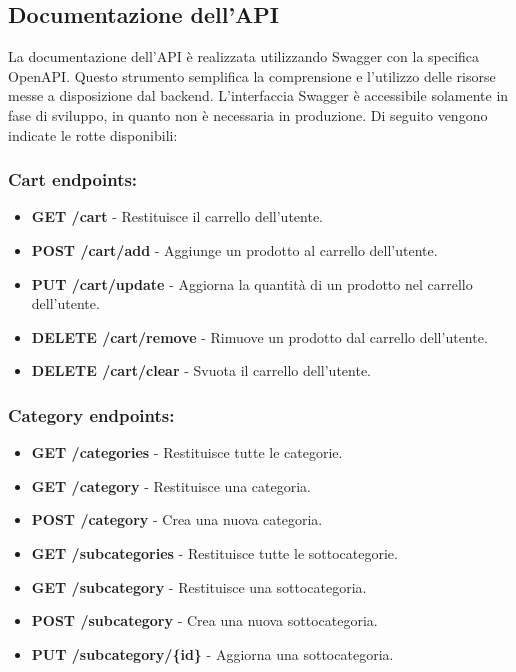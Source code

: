 \subsection{Documentazione dell'API}
La documentazione dell'API è realizzata utilizzando Swagger con la specifica OpenAPI. Questo strumento semplifica la comprensione e l'utilizzo delle risorse messe a disposizione dal backend. L'interfaccia Swagger è accessibile solamente in fase di sviluppo, in quanto non è necessaria in produzione.
Di seguito vengono indicate le rotte disponibili:

\subsubsection{Cart endpoints:}
\begin{itemize}
    \item \textbf{GET /cart} - Restituisce il carrello dell'utente.
    \item \textbf{POST /cart/add} - Aggiunge un prodotto al carrello dell'utente.
    \item \textbf{PUT /cart/update} - Aggiorna la quantità di un prodotto nel carrello dell'utente.
    \item \textbf{DELETE /cart/remove} - Rimuove un prodotto dal carrello dell'utente.
    \item \textbf{DELETE /cart/clear} - Svuota il carrello dell'utente.
\end{itemize}

\subsubsection{Category endpoints:}
\begin{itemize}
    \item \textbf{GET /categories} - Restituisce tutte le categorie.
    \item \textbf{GET /category} - Restituisce una categoria.
    \item \textbf{POST /category} - Crea una nuova categoria.
    \item \textbf{GET /subcategories} - Restituisce tutte le sottocategorie.
    \item \textbf{GET /subcategory} - Restituisce una sottocategoria.
    \item \textbf{POST /subcategory} - Crea una nuova sottocategoria.
    \item \textbf{PUT /subcategory/\{id\}} - Aggiorna una sottocategoria.
\end{itemize}

